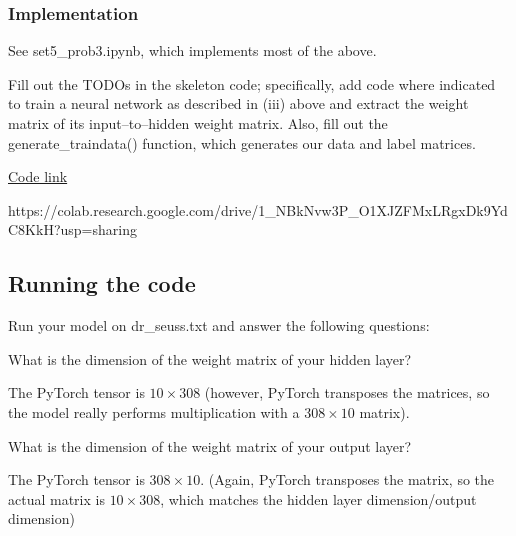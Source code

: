 \subsubsection{Implementation}

See set5_prob3.ipynb, which implements most of the above.

\newpage

\problem[10]
Fill out the TODOs in the skeleton code; specifically, add code where indicated to train a neural network as described in (iii) above and extract the weight matrix of its input--to--hidden weight matrix. Also, fill out the generate\_traindata() function, which generates our data and label matrices.


\begin{solution}
    \href{https://colab.research.google.com/drive/1_NBkNvw3P_O1XJZFMxLRgxDk9YdC8KkH?usp=sharing}{Code link}

    https://colab.research.google.com/drive/1_NBkNvw3P_O1XJZFMxLRgxDk9YdC8KkH?usp=sharing
\end{solution}

\subsection{Running the code}
Run your model on dr_seuss.txt and answer the following questions:

\problem[2]
What is the dimension of the weight matrix of your hidden layer?

\begin{solution}
    The PyTorch tensor is $10 \times 308$ (however, PyTorch transposes the matrices, so the model really performs multiplication with a $308 \times 10$ matrix).
\end{solution}

\problem[2]
What is the dimension of the weight matrix of your output layer?
\begin{solution}
    The PyTorch tensor is $308 \times 10$. (Again, PyTorch transposes the matrix, so the actual matrix is $10 \times 308$, which matches the hidden layer dimension/output dimension)
\end{solution}

